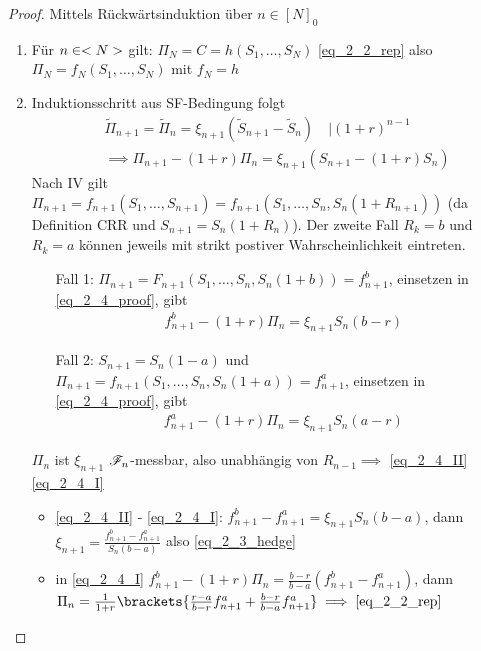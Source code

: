 \begin{proof}
	Mittels Rückwärtsinduktion über $n \in [N]_0$ 
	\begin{enumerate}
		\item Für $n \in <N>$ gilt: $\Pi_N = C = h(S_1, \dots, S_N)$ \eqref{eq_2_2_rep} also $\Pi_N = f_N(S_1, \dots, S_N)$ mit $f_N = h$
		\item Induktionsschritt aus SF-Bedingung folgt
		\begin{align*}
			&\tilde{\Pi}_{n+1} = \tilde{\Pi}_n = \xi_{n+1}(\tilde{S}_{n+1} - \tilde{S}_n) \quad | (1+r)^{n-1}\\
			&\implies \Pi_{n+1} - (1+r)\Pi_n = \xi_{n+1}(S_{n+1} - (1+r)S_n) \tag{$\ast$}\label{eq_2_4_proof}
		\end{align*}
		Nach IV gilt $\Pi_{n+1} = f_{n+1}(S_1, \dots, S_{n+1}) = f_{n+1}(S_1, \dots, S_n, S_n (1+R_{n+1}))$ (da Definition CRR und $S_{n+1} = S_n(1+R_n)$).  Der zweite Fall $R_k = b$ und $R_k = a$ können jeweils mit strikt postiver Wahrscheinlichkeit eintreten.
		\begin{itemize}
			\item[Fall 1:] $\Pi_{n+1} = F_{n+1}(S_1, \dots, S_n, S_n(1+b)) = f^b_{n+1}$, einsetzen in \eqref{eq_2_4_proof}, gibt
			\begin{align*}
				f^b_{n+1} - (1+r)\Pi_n = \xi_{n+1}S_n(b-r) \tag{I}\label{eq_2_4_I}
			\end{align*}
			\item[Fall 2:] $S_{n+1} = S_n(1-a)$ und $\Pi_{n+1} = f_{n+1}(S_1, \dots, S_n, S_n(1+a)) = f^a_{n+1}$, einsetzen in \eqref{eq_2_4_proof}, gibt
			\begin{align*}
				f^a_{n+1} - (1+r)\Pi_n = \xi_{n+1}S_n(a-r) \tag{II}\label{eq_2_4_II}
			\end{align*}
		\end{itemize}
	$\Pi_n$ ist $\xi_{n+1}$ $\mathscr F_n$-messbar, also unabhängig von $R_{n-1} \implies$ \eqref{eq_2_4_II} \eqref{eq_2_4_I}
		\begin{itemize}
			\item \eqref{eq_2_4_II} - \eqref{eq_2_4_I}: $f^b_{n+1} - f^a_{n+1} = \xi_{n+1} S_n(b-a)$, dann $\xi_{n+1} = \frac{f^b_{n+1} - f^a_{n+1}}{S_n(b-a)}$ also \eqref{eq_2_3_hedge} \checkmark
			\item in \eqref{eq_2_4_I} $f^b_{n+1}-(1+r)\Pi_n = \frac{b-r}{b-a}(f^b_{n+1}-f^a_{n+1})$, dann $\Pi_n = \frac{1}{1+r} \brackets{\frac{r-a}{b-r}f^a_{n+1} + \frac{b-r}{b-a}f^a_{n+1}} \implies \eqref{eq_2_2_rep}$ \checkmark
		\end{itemize}
	\end{enumerate}
\end{proof}
